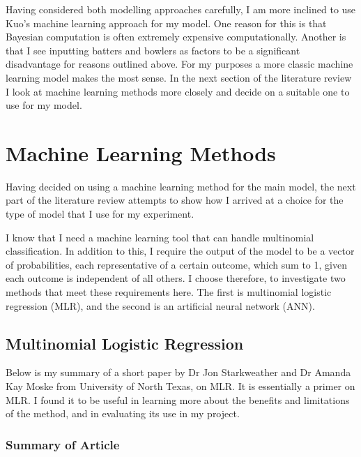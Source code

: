 
Having considered both modelling approaches carefully, I am more inclined to use Kuo’s machine learning approach for my model. One reason for this is that Bayesian computation is often extremely expensive computationally. Another is that I see inputting batters and bowlers as factors to be a significant disadvantage for reasons outlined above. For my purposes a more classic machine learning model makes the most sense. In the next section of the literature review I look at machine learning methods more closely and decide on a suitable one to use for my model.

\section{Machine Learning Methods}

Having decided on using a machine learning method for the main model, the next part of the literature review attempts to show how I arrived at a choice for the type of model that I use for my experiment.

I know that I need a machine learning tool that can handle multinomial classification. In addition to this, I require the output of the model to be a vector of probabilities, each representative of a certain outcome, which sum to 1, given each outcome is independent of all others. I choose therefore, to investigate two methods that meet these requirements here. The first is multinomial logistic regression (MLR), and the second is an artificial neural network (ANN).

\subsection{Multinomial Logistic Regression}

Below is my summary of a short paper by Dr Jon Starkweather and Dr Amanda Kay Moske from University of North Texas, on MLR.\cite{starkweather_multinomial_2011} It is essentially a primer on MLR. I found it to be useful in learning more about the benefits and limitations of the method, and in evaluating its use in my project.

\subsubsection{Summary of Article}

